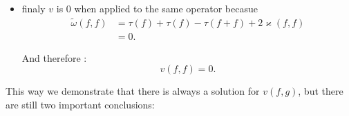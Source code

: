 \begin{itemize}
    And with this, we prove the lemma needed \citep{Cesar2024} and can continue with the conditions:
    \begin{align*}
      v(f + g, h) - v(f, h) - v(g, h) &= \frac{1}{2}\left[\tilde{\omega}(f + g, h) - \tilde{\omega}(f, h) - \tilde{\omega}(g, h)\right]\\
      \tilde{\omega}(f + g, h) &= \tilde{\omega}(f, h) + \tilde{\omega}(g, h) + 2 \varkappa (f, g, h)\\
      v(f + g, h) - v(f, h) - v(g, h) &= \frac{1}{2}\left[\tilde{\omega}(f, h) + \tilde{\omega}(g, h) + 2 \varkappa (f, g, h) - \tilde{\omega}(f, h) - \tilde{\omega}(g, h)\right]\\
      v(f + g, h) - v(f, h) - v(g, h) &= \varkappa (f, g, h)
    .\end{align*}

    And because every $f, g, h \in F$ commutes \citep{Kitaev2002}:
    \begin{equation}
      v(f + g, h) - v(f, h) - v(g, h) = 0
      \label{eq:vfg}
    .\end{equation}

  \item finaly $v$ is $0$ when applied to the same operator becasue
    \begin{align*}
      \tilde{\omega}(f, f) &= \tau(f) + \tau(f) - \tau(f + f) + 2\varkappa(f, f)\\
      &= 0
    .\end{align*}

    And therefore \citep{Cesar2024}:
    \begin{equation}
      v(f, f) = 0
      \label{eq:v_f_f}
    .\end{equation}
\end{itemize}

This way we demonstrate that there is always a solution for $v(f, g)$, but there are still two important conclusions:

